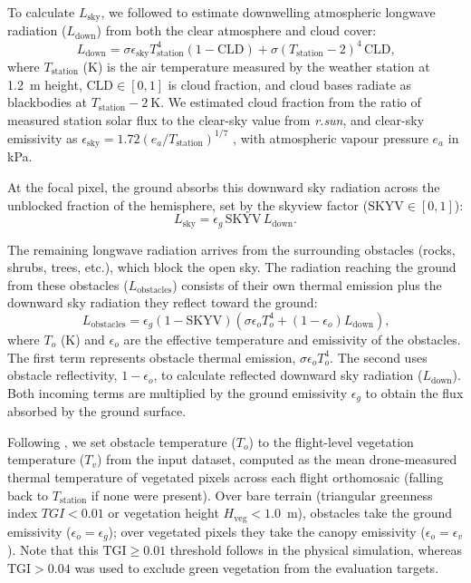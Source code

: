 \documentclass[12pt]{article}
\begin{document}
To calculate $L_{\textrm{sky}}$, we followed \citet{kearney_2017} to estimate downwelling atmospheric longwave radiation ($L_{\textrm{down}}$) from both the clear atmosphere and cloud cover:
\begin{equation} \label{eq:Ldown}
L_{\textrm{down}} = \sigma \epsilon_{\textrm{sky}} T_{\textrm{station}}^4 (1-\textrm{CLD}) + \sigma (T_{\textrm{station}}-2)^4 \, \textrm{CLD}\textrm{,}
\end{equation}
\noindent where $T_{\textrm{station}}$ (K) is the air temperature measured by the weather station at 1.2~m height, $\textrm{CLD} \in [0, 1]$ is cloud fraction, and cloud bases radiate as blackbodies at $T_{\textrm{station}} - 2~\textrm{K}$. We estimated cloud fraction from the ratio of measured station solar flux to the clear-sky value from \textit{r.sun}, and clear-sky emissivity as $\epsilon_{\textrm{sky}} = 1.72 (e_a / T_{\textrm{station}})^{1/7}$ \citep{campbell_1998}, with atmospheric vapour pressure $e_a$ in kPa.

At the focal pixel, the ground absorbs this downward sky radiation across the unblocked fraction of the hemisphere, set by the skyview factor ($\textrm{SKYV} \in [0, 1]$):
\begin{equation}
L_{\textrm{sky}} = \epsilon_g \, \textrm{SKYV} \, L_{\textrm{down}}\textrm{.}
\end{equation}

The remaining longwave radiation arrives from the surrounding obstacles (rocks, shrubs, trees, etc.), which block the open sky. The radiation reaching the ground from these obstacles ($L_{\textrm{obstacles}}$) consists of their own thermal emission plus the downward sky radiation they reflect toward the ground:
\begin{equation} \label{eq:Lobs}
L_{\textrm{obstacles}} = \epsilon_g (1 - \textrm{SKYV}) \left( \sigma \epsilon_o T_o^4 + (1 - \epsilon_o) L_{\textrm{down}} \right)\textrm{,}
\end{equation}
\noindent where $T_o$ (K) and $\epsilon_o$ are the effective temperature and emissivity of the obstacles. The first term represents obstacle thermal emission, $\sigma \epsilon_o T_o^4$. The second uses obstacle reflectivity, $1 - \epsilon_o$, to calculate reflected downward sky radiation ($L_{\textrm{down}}$). Both incoming terms are multiplied by the ground emissivity $\epsilon_g$ to obtain the flux absorbed by the ground surface.

Following \citet{Itzkovitch2025}, we set obstacle temperature ($T_o$) to the flight-level vegetation temperature ($T_v$) from the \citet{Itzkovitch2025} input dataset, computed as the mean drone-measured thermal temperature of vegetated pixels across each flight orthomosaic (falling back to $T_{\textrm{station}}$ if none were present). Over bare terrain (triangular greenness index $TGI < 0.01$ or vegetation height $H_{\textrm{veg}} < 1.0$~m), obstacles take the ground emissivity ($\epsilon_o = \epsilon_g$); over vegetated pixels they take the canopy emissivity ($\epsilon_o = \epsilon_v$). Note that this $\text{TGI} \ge 0.01$ threshold follows \citet{Itzkovitch2025} in the physical simulation, whereas $\text{TGI} > 0.04$ was used to exclude green vegetation from the evaluation targets.
\end{document}
